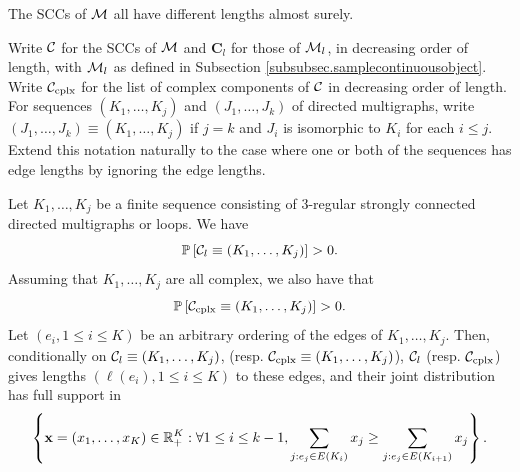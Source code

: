 \begin{corollary}\label{cor.allengthsaredifferent}
The SCCs of ${\mathcal M}$ all have different lengths almost surely.
\end{corollary}
Write ${\mathcal C}$ for the SCCs of ${\mathcal M}$ and $\mathbf{C}_l$ for those of ${\mathcal M}_l$, in decreasing order of length, with ${\mathcal M}_l$ as defined in Subsection  \ref{subsubsec.samplecontinuousobject}. Write ${\mathcal C}_{\text{cplx}}$ for the list of complex components of ${\mathcal C}$ in decreasing order of length. For sequences $(K_1,\dots, K_j)$ and $(J_1,\dots,J_k)$ of directed multigraphs, write $(J_1,\dots,J_k)\equiv(K_1,\dots, K_j)$ if $j=k$ and $J_i$ is isomorphic to $K_i$ for each $i\leq j$. Extend this notation naturally to the case where one or both of the sequences has edge lengths by ignoring the edge lengths. 
\begin{corollary}
Let $K_1,\dots, K_j$ be a finite sequence consisting of $3$-regular strongly connected directed multigraphs or loops. We have 
$${\mathbb P}\left[{\mathcal C}_l\equiv(K_1,\dots, K_j)\right]>0.$$
Assuming that $K_1,\dots, K_j$ are all complex, we also have that 
$${\mathbb P}\left[ {\mathcal C}_{\text{cplx}}\equiv(K_1,\dots, K_j)\right]>0.$$
Let $(e_i,1\leq i \leq K)$ be an arbitrary ordering of the edges of $K_1,\dots, K_j$. Then, conditionally on ${\mathcal C}_l\equiv(K_1,\dots, K_j)$, (resp. ${\mathcal C}_{\text{cplx}}\equiv(K_1,\dots, K_j)$), ${\mathcal C}_l$ (resp. ${\mathcal C}_{\text{cplx}}$) gives lengths $(\ell(e_i),1\leq i \leq K)$ to these edges, and their joint distribution has full support in 
$$\left\{\mathbf{x}=(x_1,\dots, x_K)\in {\mathbb R}_+^K:\forall 1\leq i\leq k-1, \sum_{j:e_j\in E(K_i)}x_j \geq \sum_{j:e_j\in E(K_{i+1})}x_j\right\}.$$
\end{corollary}



